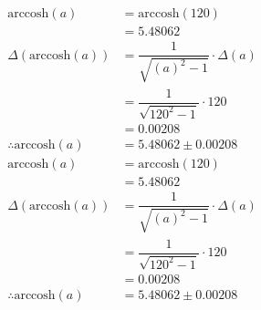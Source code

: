 \documentclass[a4paper]{article}
\begin{document}
\begin{align*}
\text{arccosh} \left( a \right) &= \text{arccosh} \left( 120 \right) \\
&= 5.48062 \\[4mm]
\Delta \left( \text{arccosh} \left( a \right) \right) &= \dfrac{ 1 }{ \sqrt{ \left( a \right) ^ { 2 } - 1} } \cdot \Delta \left( a \right) \\
&= \dfrac{ 1 }{ \sqrt{ 120 ^ { 2 } - 1} } \cdot 120 \\
&= 0.00208\\[4mm]
\therefore \text{arccosh} \left( a \right) &= 5.48062 \pm 0.00208
\end{align*}
\begin{align*}
\text{arccosh} \left( a \right) &= \text{arccosh} \left( 120 \right) \\
&= 5.48062 \\[4mm]
\Delta \left( \text{arccosh} \left( a \right) \right) &= \dfrac{ 1 }{ \sqrt{ \left( a \right) ^ { 2 } - 1} } \cdot \Delta \left( a \right) \\
&= \dfrac{ 1 }{ \sqrt{ 120 ^ { 2 } - 1} } \cdot 120 \\
&= 0.00208\\[4mm]
\therefore \text{arccosh} \left( a \right) &= 5.48062 \pm 0.00208
\end{align*}
\end{document}
